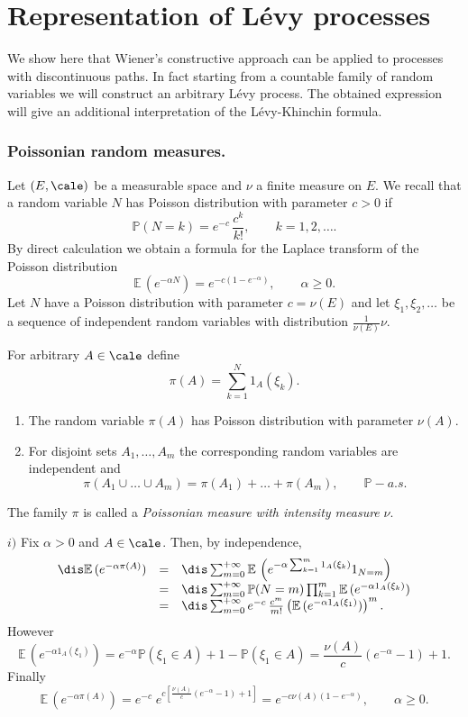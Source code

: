 \documentclass[preprint]{imsart}
\def\P{\mathbb P}
\def\E{\mathbb E}
\begin{document}
{\chapter{Representation of L\'evy processes}


We show here that Wiener's constructive approach can be applied
to processes with discontinuous paths. In fact starting from a
countable family of random variables we will construct an arbitrary
L\'evy process. The obtained
expression will give an additional interpretation of the
L\'evy-Khinchin formula.


\subsection{Poissonian random measures.}

Let $(E,\cale)$ be a measurable space and $\nu$ a finite measure on $E$.
We recall that a random variable $N$ has Poisson distribution with
parameter $c>0$ if
$$
\P(N=k)=e^{-c}\, \frac{c^k}{k!},\qquad k=1,2,\ldots.
$$
By direct calculation we obtain a formula for the Laplace
transform of the Poisson distribution
$$
\E\, (e^{-\alpha N})= e^{-c(1-e^{-\alpha})},
\qquad \alpha\geq 0.
$$
Let $N$ have a Poisson distribution with parameter $c=\nu(E)$ and
let $\xi_1,\xi_2,\ldots$ be a sequence of independent random
variables with distribution $\frac{1}{\nu(E)}\nu$.

\begin{Theorem}\label{poissonrandommeasure}
  For arbitrary $A\in\cale$ define
  $$
  \pi(A)=\sum_{k=1}^N1_A(\xi_k).
  $$
\begin{enumerate}\item[i)]
The random variable $\pi(A)$ has Poisson distribution with
parameter $\nu(A)$.
\item[ii)] For disjoint sets $A_1,\ldots,A_m$ the corresponding
 random variables are independent and
 $$
 \pi(A_1\cup \ldots\cup A_m)=\pi(A_1)+\ldots+\pi(A_m),
 \qquad \P-a.s.
 $$
 \end{enumerate}
\end{Theorem}

\noindent The family $\pi$ is called a {\it Poissonian measure with intensity
measure} $\nu$.

$i)$ Fix $\alpha>0$ and $A\in \cale$. Then,  by   independence,
$$\begin{array}{lll}\dis
\E\, (e^{-\alpha \pi(A)})
&=&\dis
\sum_{m=0}^{+\infty}
\E\, \left(e^{-\alpha \sum_{k=1}^m 1_A(\xi_k)}1_{N=m}\right)
\\&=&\dis
\sum_{m=0}^{+\infty}\P(N=m) \prod_{k=1}^m
\E\, (e^{-\alpha  1_A(\xi_k)})
\\&=&\dis
\sum_{m=0}^{+\infty}e^{-c}\, \frac{c^m}{m!} \left(
\E\, (e^{-\alpha  1_A(\xi_1)})\right)^m.
\end{array}
$$
However
$$
\E\, (e^{-\alpha  1_A(\xi_1)})=
e^{-\alpha}\P(\xi_1\in A)+1-\P(\xi_1\in A)
= \frac{\nu(A)}{c}(e^{-\alpha}-1)+1.
$$
Finally
$$
\E\, (e^{-\alpha \pi(A)})=e^{-c}\; e^{c[
\frac{\nu(A)}{c}(e^{-\alpha}-1)+1]}
= e^{-c\nu(A)(1-e^{-\alpha})},\qquad \alpha\geq 0.
$$

}
\end{document}

